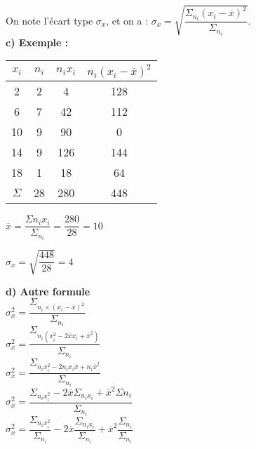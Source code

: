 On note l'écart type $\sigma_x$, et on a : $ \sigma_x = \sqrt{\dfrac{\Sigma_{n_i}\left(x_i - \overline{x}\right)^2}{\Sigma_{n_i}}} $. \\

\textbf{c) Exemple :} \\

\begin{tabular}{c|c|c|c}
$x_i$ & $n_i$ & $n_ix_i$ & $n_i\left(x_i - \overline{x}\right)^2$ \\
\hline
2 & 2 & 4 & 128 	\\
6 & 7 & 42 & 112 \\
10 & 9 & 90 & 0 \\
14 & 9 & 126 & 144 \\
18 & 1 & 18 & 64 \\
\hline
$\Sigma$ & 28 & 280 & 448 \\
\end{tabular}

\vspace*{.3cm}

$ \overline{x} = \dfrac{\Sigma{n_ix_i}}{\Sigma_{n_i}} = \dfrac{280}{28} = 10 $ \\

\vspace*{.3cm}

$\sigma_x = \sqrt{\dfrac{448}{28}} = 4 $ \\

\newpage

\vspace*{-1cm}

\textbf{d) Autre formule} \\

$ \sigma_x^2 = \dfrac{\Sigma_{n_i \times \left(x_i - \overline{x}\right)^2}}{\Sigma_{n_i}} $ \\

$ \sigma_x^2 = \dfrac{\Sigma_{n_i \left(x_i^2 - 2\overline{x}x_i + \overline{x}^2\right)}}{\Sigma_{n_i}} $ \\

$ \sigma_x^2 = \dfrac{\Sigma_{n_ix_i^2 - 2n_ix_i\overline{x} + n_i\overline{x}^2}}{\Sigma_{n_i}} $ \\

$ \sigma_x^2 = \dfrac{\Sigma_{n_ix_i^2} - 2\overline{x}\Sigma_{n_ix_i} + \overline{x}^2\Sigma{n_i}}{\Sigma_{n_i}} $ \\

$ \sigma_x^2 = \dfrac{\Sigma_{n_ix_i^2}}{\Sigma_{n_i}} - 2\overline{x} \dfrac{\Sigma_{n_ix_i}}{\Sigma_{n_i}} + \overline{x}^2 \dfrac{\Sigma_{n_i}}{\Sigma_{n_i}} $ \\

